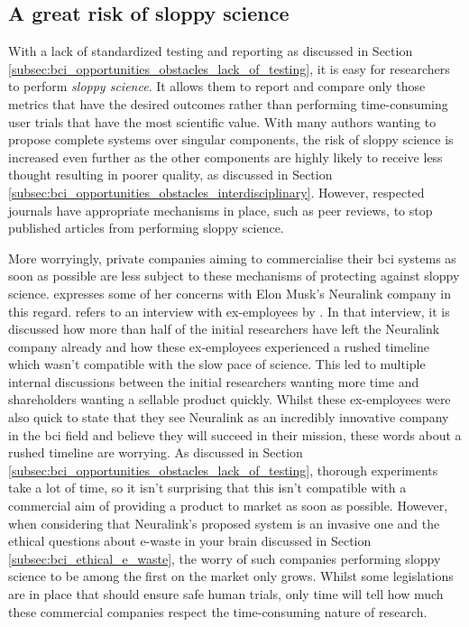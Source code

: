 
\subsection{A great risk of sloppy science}
\label{subsec:bci_ethical_sloppy_science}

With a lack of standardized testing and reporting as discussed in Section \ref{subsec:bci_opportunities_obstacles_lack_of_testing}, it is easy for researchers to perform \textit{sloppy science}.
It allows them to report and compare only those metrics that have the desired outcomes rather than performing time-consuming user trials that have the most scientific value.
With many authors wanting to propose complete systems over singular components, the risk of sloppy science is increased even further as the other components are highly likely to receive less thought resulting in poorer quality, as discussed in Section \ref{subsec:bci_opportunities_obstacles_interdisciplinary}.
However, respected journals have appropriate mechanisms in place, such as peer reviews, to stop published articles from performing sloppy science.

More worryingly, private companies aiming to commercialise their \gls{bci} systems as soon as possible are less subject to these mechanisms of protecting against sloppy science.
 expresses some of her concerns with Elon Musk's Neuralink company in this regard.
 refers to an interview with ex-employees by \citet{neuralink_rushed_timelines}.
In that interview, it is discussed how more than half of the initial researchers have left the Neuralink company already and how these ex-employees experienced a rushed timeline which wasn't compatible with the slow pace of science.
This led to multiple internal discussions between the initial researchers wanting more time and shareholders wanting a sellable product quickly.
Whilst these ex-employees were also quick to state that they see Neuralink as an incredibly innovative company in the \gls{bci} field and believe they will succeed in their mission, these words about a rushed timeline are worrying.
As discussed in Section \ref{subsec:bci_opportunities_obstacles_lack_of_testing}, thorough experiments take a lot of time, so it isn't surprising that this isn't compatible with a commercial aim of providing a product to market as soon as possible.
However, when considering that Neuralink's proposed system is an invasive one and the ethical questions about e-waste in your brain discussed in Section \ref{subsec:bci_ethical_e_waste}, the worry of such companies performing sloppy science to be among the first on the market only grows.
Whilst some legislations are in place that should ensure safe human trials, only time will tell how much these commercial companies respect the time-consuming nature of research.


